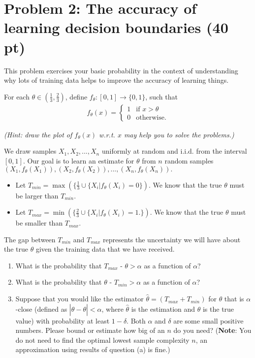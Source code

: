\documentclass[a4 paper]{article}
\newcommand{\0}{\mathbf{0}}
\begin{document}
\section*{Problem 2: The accuracy of learning decision boundaries (40 pt)}

This problem exercises your basic probability in the context of understanding why lots of training data helps to improve the accuracy of learning things.

For each $\theta \in (\frac{1}{3},\frac{2}{3})$, define $f_\theta : [0,1] \rightarrow \{0,1\}$, such that
\begin{align*}
    f_\theta(x) =
    \begin{cases}
    1 & \text{if } x>\theta \\
    0 & \text{otherwise.}
    \end{cases}
\end{align*}

\textit{(Hint: draw the plot of $f_\theta (x)$ w.r.t. $x$ may help you to solve the problems.)}

We draw samples $X_1,X_2,...,X_n$ uniformly at random and i.i.d. from the interval $[0,1]$. Our goal is to learn an estimate for $\theta$ from $n$ random samples $(X_1, f_\theta (X_1)),(X_2, f_\theta (X_2)),...,(X_n, f_\theta (X_n)).$ 

\begin{itemize}
    \item Let $T_{min} = \max (\{\frac{1}{3} \cup \{X_i | f_\theta(X_i) = 0 \}).$ We know that the true $\theta$ must be larger than $T_{min}.$

    \item Let $T_{max} = \min(\{\frac{2}{3} \cup \{X_i | f_\theta(X_i) = 1. \}).$ We know that the true $\theta$ must be smaller than $T_{max}$.
\end{itemize}

The gap between $T_{min}$ and $T_{max}$ represents the uncertainty we will have about the true $\theta$ given the training data that we have received.

\begin{enumerate}[label=(\alph*)]
    \item What is the probability that $T_{max}$ - $\theta > \alpha$ as a function of $\alpha$? 
    
    \item What is the probability that $\theta$ - $T_{min} > \alpha$ as a function of $\alpha$?
    
    \item Suppose that you would like the estimator $\hat{\theta} = (T_{max} + T_{min})$ for $\theta$ that is $\alpha$-close (defined as $|\hat{\theta} - \theta| < \alpha$, where $\hat{\theta}$ is the estimation and $\theta$ is the true value) with probability at least $1 - \delta$. Both $\alpha$ and $\delta$ are some small positive numbers. Please bound or estimate how big of an $n$ do you need? (\textbf{Note}: You do not need to find the optimal lowest sample complexity $n$, an approximation using results of question (a) is fine.)
\end{enumerate}
\end{document}
